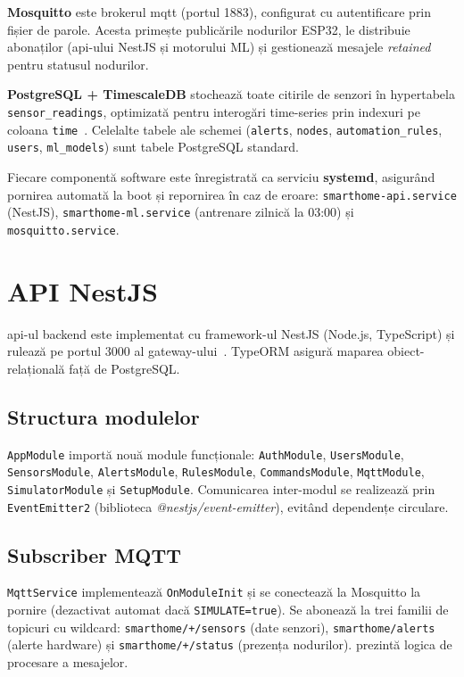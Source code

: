 \textbf{Mosquitto} este brokerul \gls{mqtt} (portul 1883), configurat cu
autentificare prin fișier de parole.
Acesta primește publicările nodurilor ESP32, le distribuie abonaților
(\gls{api}-ului NestJS și motorului ML) și gestionează mesajele
\emph{retained} pentru statusul nodurilor.

\textbf{PostgreSQL + TimescaleDB} stochează toate citirile de senzori în
hypertabela \texttt{sensor\_readings}, optimizată pentru interogări
time-series prin indexuri pe coloana \texttt{time}~\cite{timescaledb2017,postgresql2024}.
Celelalte tabele ale schemei (\texttt{alerts}, \texttt{nodes},
\texttt{automation\_rules}, \texttt{users}, \texttt{ml\_models}) sunt
tabele PostgreSQL standard.

Fiecare componentă software este înregistrată ca serviciu \textbf{systemd},
asigurând pornirea automată la boot și repornirea în caz de eroare:
\texttt{smarthome-api.service} (NestJS),
\texttt{smarthome-ml.service} (antrenare zilnică la 03:00) și
\texttt{mosquitto.service}.

\section{API NestJS}
\label{sec:api}

\gls{api}-ul backend este implementat cu framework-ul NestJS (Node.js,
TypeScript) și rulează pe portul 3000 al gateway-ului~\cite{nestjs2024}.
TypeORM asigură maparea obiect-relațională față de PostgreSQL.

\subsection{Structura modulelor}
\label{sec:module-nestjs}

\texttt{AppModule} importă nouă module funcționale:
\texttt{AuthModule}, \texttt{UsersModule}, \texttt{SensorsModule},
\texttt{AlertsModule}, \texttt{RulesModule}, \texttt{CommandsModule},
\texttt{MqttModule}, \texttt{SimulatorModule} și \texttt{SetupModule}.
Comunicarea inter-modul se realizează prin \texttt{EventEmitter2}
(biblioteca \emph{@nestjs/event-emitter}), evitând dependențe circulare.

\subsection{Subscriber MQTT}
\label{sec:subscriber-mqtt}

\texttt{MqttService} implementează \texttt{OnModuleInit} și se conectează
la Mosquitto la pornire (dezactivat automat dacă \texttt{SIMULATE=true}).
Se abonează la trei familii de topicuri cu wildcard:
\texttt{smarthome/+/sensors} (date senzori), \texttt{smarthome/alerts}
(alerte hardware) și \texttt{smarthome/+/status} (prezența nodurilor).
 prezintă logica de procesare a mesajelor.

